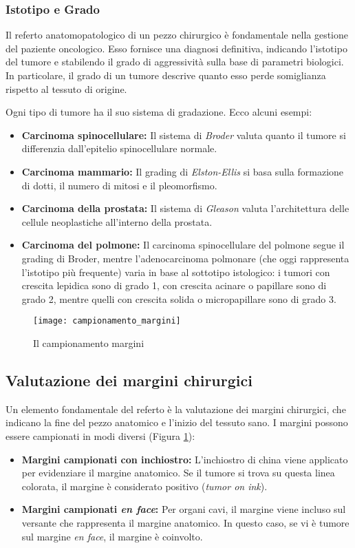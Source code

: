 \subsubsection{Istotipo e Grado}
Il referto anatomopatologico di un pezzo chirurgico è fondamentale nella gestione del paziente oncologico. Esso fornisce una diagnosi definitiva, indicando l’istotipo del tumore e stabilendo il grado di aggressività sulla base di parametri biologici. In particolare, il grado di un tumore descrive quanto esso perde somiglianza rispetto al tessuto di origine.

Ogni tipo di tumore ha il suo sistema di gradazione. Ecco alcuni esempi:
\begin{itemize}
    \item \textbf{Carcinoma spinocellulare:} Il sistema di \textit{Broder} valuta quanto il tumore si differenzia dall'epitelio spinocellulare normale.
    \item \textbf{Carcinoma mammario:} Il grading di \textit{Elston-Ellis} si basa sulla formazione di dotti, il numero di mitosi e il pleomorfismo.
    \item \textbf{Carcinoma della prostata:} Il sistema di \textit{Gleason} valuta l'architettura delle cellule neoplastiche all'interno della prostata.
    \item \textbf{Carcinoma del polmone:} Il carcinoma spinocellulare del polmone segue il grading di Broder, mentre  l'adenocarcinoma polmonare (che oggi rappresenta l'istotipo più frequente) varia in base al sottotipo istologico: i tumori con crescita lepidica sono di grado 1, con crescita acinare o papillare sono di grado 2, mentre quelli con crescita solida o micropapillare sono di grado 3.
\end{itemize}

\begin{figure}[p]
    \centering
    \texttt{[image: campionamento\_margini]}
    \caption{Il campionamento margini}
    \label{fig:campionamento_margini}
\end{figure}

\subsection{Valutazione dei margini chirurgici}
Un elemento fondamentale del referto è la valutazione dei margini chirurgici, che indicano la fine del pezzo anatomico e l'inizio del tessuto sano. I margini possono essere campionati in modi diversi (Figura \ref{fig:campionamento_margini}):
\begin{itemize}
    \item \textbf{Margini campionati con inchiostro:} L'inchiostro di china viene applicato per evidenziare il margine anatomico. Se il tumore si trova su questa linea colorata, il margine è considerato positivo (\textit{tumor on ink}).
    \item \textbf{Margini campionati \textit{en face}:} Per organi cavi, il margine viene incluso sul versante che rappresenta il margine anatomico. In questo caso, se vi è tumore sul margine \textit{en face}, il margine è coinvolto.
\end{itemize}

